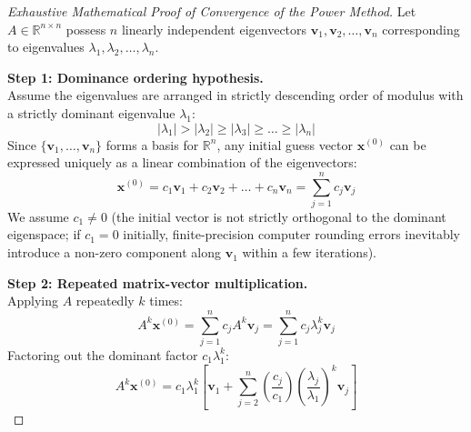 \begin{proof}[Exhaustive Mathematical Proof of Convergence of the Power Method]
Let $A \in \mathbb{R}^{n \times n}$ possess $n$ linearly independent eigenvectors $\mathbf{v}_1, \mathbf{v}_2, \dots, \mathbf{v}_n$ corresponding to eigenvalues $\lambda_1, \lambda_2, \dots, \lambda_n$.

\medskip
\noindent\textbf{Step 1: Dominance ordering hypothesis.} \\
Assume the eigenvalues are arranged in strictly descending order of modulus with a strictly dominant eigenvalue $\lambda_1$:
\begin{equation}
    |\lambda_1| > |\lambda_2| \ge |\lambda_3| \ge \dots \ge |\lambda_n|
\end{equation}
Since $\{\mathbf{v}_1, \dots, \mathbf{v}_n\}$ forms a basis for $\mathbb{R}^n$, any initial guess vector $\mathbf{x}^{(0)}$ can be expressed uniquely as a linear combination of the eigenvectors:
\begin{equation}
    \mathbf{x}^{(0)} = c_1 \mathbf{v}_1 + c_2 \mathbf{v}_2 + \dots + c_n \mathbf{v}_n = \sum_{j=1}^n c_j \mathbf{v}_j
\end{equation}
We assume $c_1 \ne 0$ (the initial vector is not strictly orthogonal to the dominant eigenspace; if $c_1 = 0$ initially, finite-precision computer rounding errors inevitably introduce a non-zero component along $\mathbf{v}_1$ within a few iterations).

\medskip
\noindent\textbf{Step 2: Repeated matrix-vector multiplication.} \\
Applying $A$ repeatedly $k$ times:
\begin{equation}
    A^k \mathbf{x}^{(0)} = \sum_{j=1}^n c_j A^k \mathbf{v}_j = \sum_{j=1}^n c_j \lambda_j^k \mathbf{v}_j
\end{equation}
Factoring out the dominant factor $c_1 \lambda_1^k$:
\begin{equation}
    A^k \mathbf{x}^{(0)} = c_1 \lambda_1^k \left[ \mathbf{v}_1 + \sum_{j=2}^n \left(\frac{c_j}{c_1}\right) \left(\frac{\lambda_j}{\lambda_1}\right)^k \mathbf{v}_j \right]
\end{equation}


\end{proof}
